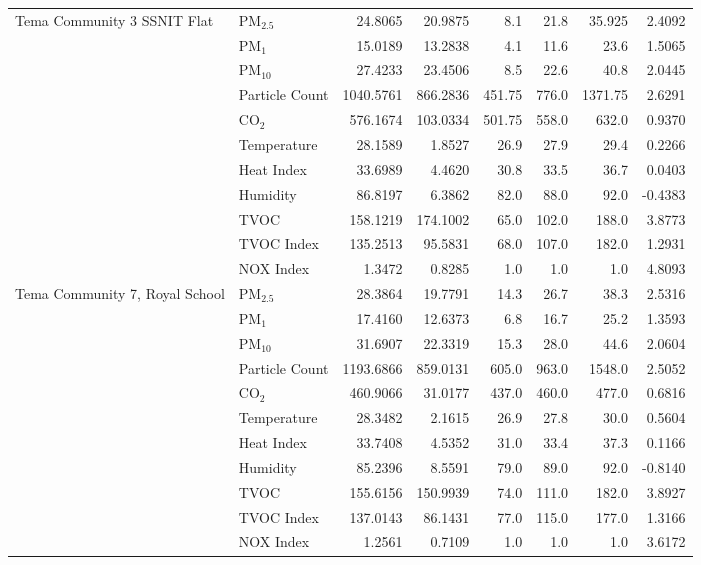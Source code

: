 \documentclass[a4paper,fleqn]{cas-sc}
\begin{document}
\begin{table}[htb]
{\begin{tabular}{llrrrrrr}
\multirow{11}{*}{Tema Community 3 SSNIT Flat}
& PM$_{2.5}$ & 24.8065 & 20.9875 & 8.1 & 21.8 & 35.925 & 2.4092 \\
& PM$_1$ & 15.0189 & 13.2838 & 4.1 & 11.6 & 23.6 & 1.5065 \\
& PM$_{10}$ & 27.4233 & 23.4506 & 8.5 & 22.6 & 40.8 & 2.0445 \\
& Particle Count & 1040.5761 & 866.2836 & 451.75 & 776.0 & 1371.75 & 2.6291 \\
& CO$_2$ & 576.1674 & 103.0334 & 501.75 & 558.0 & 632.0 & 0.9370 \\
& Temperature & 28.1589 & 1.8527 & 26.9 & 27.9 & 29.4 & 0.2266 \\
& Heat Index & 33.6989 & 4.4620 & 30.8 & 33.5 & 36.7 & 0.0403 \\
& Humidity & 86.8197 & 6.3862 & 82.0 & 88.0 & 92.0 & -0.4383 \\
& TVOC & 158.1219 & 174.1002 & 65.0 & 102.0 & 188.0 & 3.8773 \\
& TVOC Index & 135.2513 & 95.5831 & 68.0 & 107.0 & 182.0 & 1.2931 \\
& NOX Index & 1.3472 & 0.8285 & 1.0 & 1.0 & 1.0 & 4.8093 \\
\midrule

\multirow{11}{*}{Tema Community 7, Royal School}
& PM$_{2.5}$ & 28.3864 & 19.7791 & 14.3 & 26.7 & 38.3 & 2.5316 \\
& PM$_1$ & 17.4160 & 12.6373 & 6.8 & 16.7 & 25.2 & 1.3593 \\
& PM$_{10}$ & 31.6907 & 22.3319 & 15.3 & 28.0 & 44.6 & 2.0604 \\
& Particle Count & 1193.6866 & 859.0131 & 605.0 & 963.0 & 1548.0 & 2.5052 \\
& CO$_2$ & 460.9066 & 31.0177 & 437.0 & 460.0 & 477.0 & 0.6816 \\
& Temperature & 28.3482 & 2.1615 & 26.9 & 27.8 & 30.0 & 0.5604 \\
& Heat Index & 33.7408 & 4.5352 & 31.0 & 33.4 & 37.3 & 0.1166 \\
& Humidity & 85.2396 & 8.5591 & 79.0 & 89.0 & 92.0 & -0.8140 \\
& TVOC & 155.6156 & 150.9939 & 74.0 & 111.0 & 182.0 & 3.8927 \\
& TVOC Index & 137.0143 & 86.1431 & 77.0 & 115.0 & 177.0 & 1.3166 \\
& NOX Index & 1.2561 & 0.7109 & 1.0 & 1.0 & 1.0 & 3.6172 \\
\midrule


\end{tabular}}
\end{table}
\end{document}
